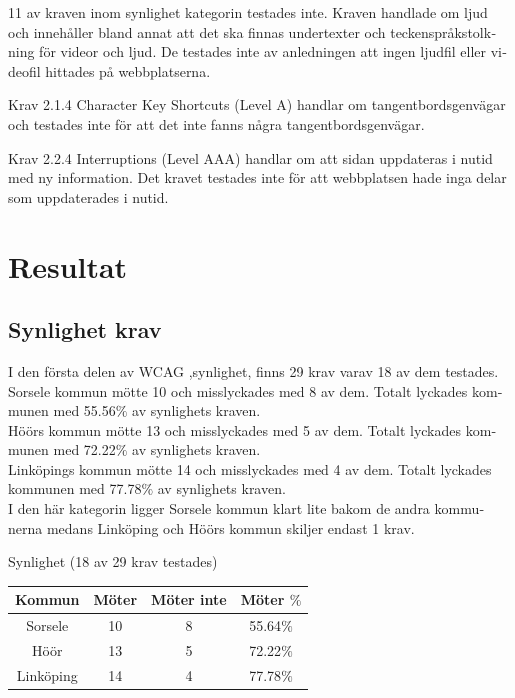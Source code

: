 \documentclass[11p]{article}
\begin{document}
\begin{otherlanguage}{swedish}
    11 av kraven inom synlighet kategorin testades inte.
    Kraven handlade om ljud och innehåller bland annat att det ska finnas undertexter och teckenspråkstolkning för videor och ljud.
    De testades inte av anledningen att ingen ljudfil eller videofil hittades på webbplatserna.

    Krav 2.1.4 Character Key Shortcuts (Level A) handlar om tangentbordsgenvägar och testades inte för att det inte fanns några tangentbordsgenvägar.

    Krav 2.2.4 Interruptions (Level AAA) handlar om att sidan uppdateras i nutid med ny information.
    Det kravet testades inte för att webbplatsen hade inga delar som uppdaterades i nutid.

    \section{Resultat} %



    \subsection{Synlighet krav}
    I den första delen av WCAG ,synlighet, finns 29 krav varav 18 av dem testades.
    Sorsele kommun mötte 10 och misslyckades med 8 av dem.
    Totalt lyckades kommunen med 55.56$\%$ av synlighets kraven.
    \\Höörs kommun mötte 13 och misslyckades med 5 av dem.
    Totalt lyckades kommunen med 72.22$\%$ av synlighets kraven.
    \\Linköpings kommun mötte 14 och misslyckades med 4 av dem.
    Totalt lyckades kommunen med 77.78$\%$ av synlighets kraven.
    \\I den här kategorin ligger Sorsele kommun klart lite bakom de andra kommunerna medans Linköping och Höörs kommun skiljer endast 1 krav.

    \newpage
    \begin{center}
    Synlighet (18 av 29 krav testades)

    \begin{tabular}{ |c|c|c|c|}
        \hline
        Kommun & Möter & Möter inte & Möter $\%$ \\  \hline
        Sorsele & 10 & 8 & 55.64$\%$ \\ \hline
        Höör & 13 & 5 & 72.22$\%$ \\ \hline
        Linköping & 14 & 4 & 77.78$\%$ \\ \hline
    \end{tabular}
    \end{center}


\end{otherlanguage}
\end{document}
